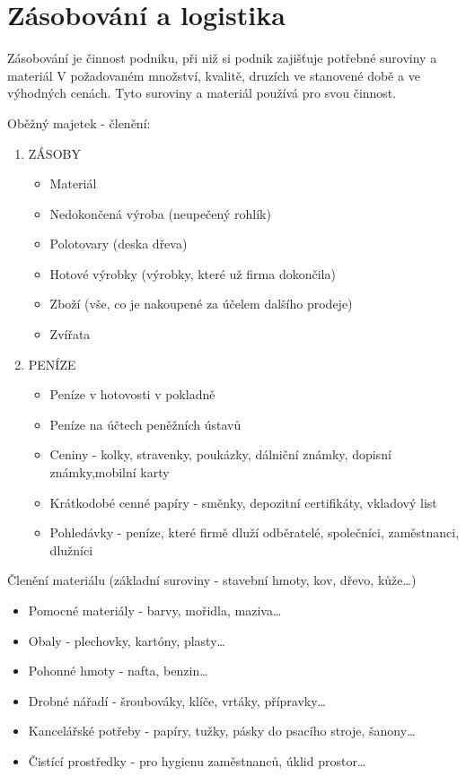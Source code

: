 \documentclass[11pt,a4paper,twoside]{book}
\begin{document}
	\chapter{Zásobování a logistika}

	Zásobování je činnost podniku, při niž si podnik zajišťuje potřebné suroviny a materiál V požadovaném množství, kvalitě, druzích ve stanovené době a ve výhodných cenách. Tyto suroviny a materiál používá pro svou činnost.

	Oběžný majetek - členění:
	\begin{enumerate}
		\item ZÁSOBY
			\begin{itemize}
				\item Materiál
				\item Nedokončená výroba (neupečený rohlík)
				\item Polotovary (deska dřeva)
				\item Hotové výrobky (výrobky, které už firma dokončila)
				\item Zboží (vše, co je nakoupené za účelem dalšího prodeje)
				\item Zvířata
			\end{itemize}
		\item PENÍZE
			\begin{itemize}
				\item Peníze v hotovosti v pokladně
				\item Peníze na účtech peněžních ústavů
				\item Ceniny - kolky, stravenky, poukázky, dálniční známky, dopisní známky,mobilní karty
				\item Krátkodobé cenné papíry - směnky, depozitní certifikáty, vkladový list
				\item Pohledávky - peníze, které firmě dluží odběratelé, společníci, zaměstnanci, dlužníci
			\end{itemize}		
	\end{enumerate}

	Členění materiálu (základní suroviny - stavební hmoty, kov, dřevo, kůže\ldots)
	\begin{itemize}
		\item Pomocné materiály - barvy, mořidla, maziva\ldots
		\item Obaly - plechovky, kartóny, plasty\ldots
		\item Pohonné hmoty - nafta, benzin\ldots
		\item Drobné nářadí - šroubováky, klíče, vrtáky, přípravky\ldots
		\item Kancelářské potřeby - papíry, tužky, pásky do psacího stroje, šanony\ldots
		\item Čistící prostředky - pro hygienu zaměstnanců, úklid prostor\ldots
	\end{itemize}
\end{document}
